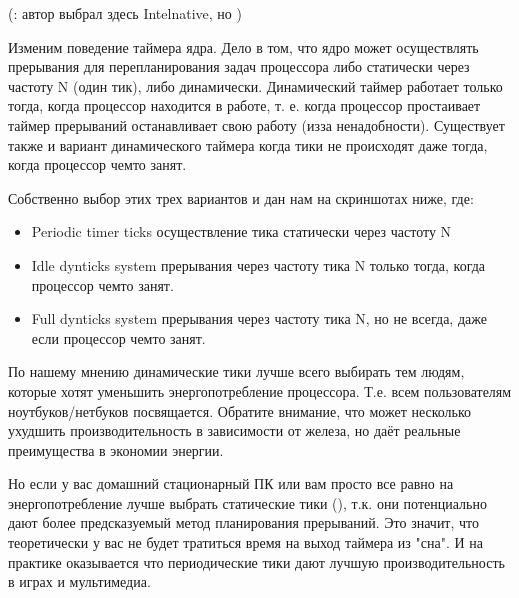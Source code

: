 \documentclass[letterpaper,10pt,russian,openany]{sphinxmanual}
\begin{document}
\sphinxAtStartPar
{}

\noindent{}

\sphinxAtStartPar
(: автор выбрал здесь Intel\sphinxhyphen{}native, но  )

\sphinxAtStartPar
{} Изменим поведение таймера ядра.
Дело в том, что ядро может осуществлять прерывания для перепланирования задач процессора либо статически через частоту N (один тик), либо динамически.
Динамический таймер работает только тогда, когда процессор находится в работе, т. е. когда процессор простаивает
таймер прерываний останавливает свою работу (из\sphinxhyphen{}за ненадобности). Существует также и вариант динамического таймера
когда тики не происходят даже тогда, когда процессор чем\sphinxhyphen{}то занят.

\sphinxAtStartPar
Собственно выбор этих трех вариантов и дан нам на скриншотах ниже, где:
\begin{itemize}
\item {} 
\sphinxAtStartPar
Periodic timer ticks \sphinxhyphen{} осуществление тика статически через частоту N

\item {} 
\sphinxAtStartPar
Idle dynticks system \sphinxhyphen{} прерывания через частоту тика N только тогда, когда процессор чем\sphinxhyphen{}то занят.

\item {} 
\sphinxAtStartPar
Full dynticks system \sphinxhyphen{} прерывания через частоту тика N, но не всегда, даже если процессор чем\sphinxhyphen{}то занят.

\end{itemize}

\sphinxAtStartPar
{}

\sphinxAtStartPar
По нашему мнению динамические тики лучше всего выбирать тем людям, которые хотят уменьшить энергопотребление процессора.
Т.е. всем пользователям ноутбуков/нетбуков посвящается. Обратите внимание, что  может несколько ухудшить производительность
в зависимости от железа, но даёт реальные преимущества в экономии энергии.

\sphinxAtStartPar
Но если у вас домашний стационарный ПК или вам просто все равно на энергопотребление \sphinxhyphen{} лучше выбрать статические тики (),
т.к. они потенциально дают более предсказуемый метод планирования прерываний.
Это значит, что теоретически у вас не будет тратиться время на выход таймера из "сна".
И на практике оказывается что периодические тики дают лучшую производительность в играх и мультимедиа.
\end{document}
